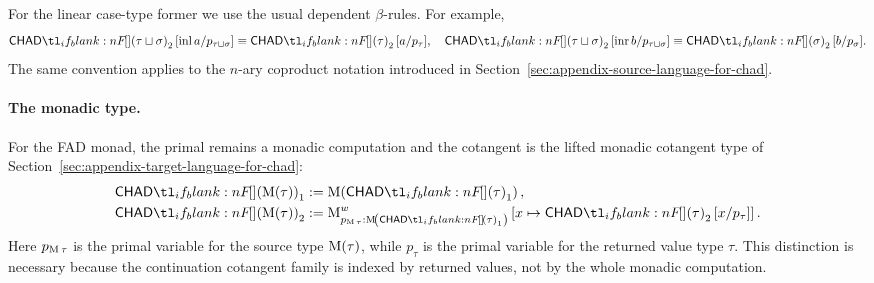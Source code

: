 \documentclass[11pt,a4paper]{article}
\theoremstyle{definition}
\theoremstyle{remark}
\providecommand{\casubst}[3]{#1[#3/#2]}
\begin{document}
For the linear case-type former we use the usual dependent \(\beta\)-rules.  For
example,
\begin{equation*}
  \casubst{\Fun[np]{\chad}{\tau \sqcup \sigma}_{2}}{p_{\tau\sqcup\sigma}}{\opn[b]{inl}a}
  \equiv
  \casubst{\Fun[np]{\chad}{\tau}_{2}}{p_{\tau}}{a},
  \quad
  \casubst{\Fun[np]{\chad}{\tau \sqcup \sigma}_{2}}{p_{\tau\sqcup\sigma}}{\opn[b]{inr}b}
  \equiv
  \casubst{\Fun[np]{\chad}{\sigma}_{2}}{p_{\sigma}}{b}.
\end{equation*}
The same convention applies to the \(n\)-ary coproduct notation introduced in
Section~\ref{sec:appendix-source-language-for-chad}.

\paragraph{The monadic type.}
For the FAD monad, the primal remains a monadic computation and the cotangent is
the lifted monadic cotangent type of Section~\ref{sec:appendix-target-language-for-chad}:
\begin{equation}
  \label{eq:appendix-chad-type-translation-monad}
  \begin{aligned}
    \Fun[np]{\chad}{\Fun[nn]{\opn[b]{M}}{\tau}}_{1}
    &:=
    \Fun[nn]{\opn[b]{M}}{\Fun[np]{\chad}{\tau}_{1}},
    \\
    \Fun[np]{\chad}{\Fun[nn]{\opn[b]{M}}{\tau}}_{2}
    &:=
    \opn[b]{M}^{w}_{p_{\opn[b]{M}\tau} : \Fun[nn]{\opn[b]{M}}{\Fun[np]{\chad}{\tau}_{1}}}
    \left[
      x \mapsto \casubst{\Fun[np]{\chad}{\tau}_{2}}{p_{\tau}}{x}
    \right].
  \end{aligned}
\end{equation}
Here \(p_{\opn[b]{M}\tau}\) is the primal variable for the source type
\(\Fun[nn]{\opn[b]{M}}{\tau}\), while \(p_{\tau}\) is the primal variable
for the returned value type \(\tau\).  This distinction is necessary because the
continuation cotangent family is indexed by returned values, not by the whole
monadic computation.
\end{document}
